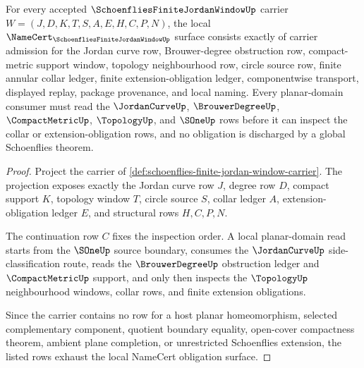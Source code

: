 \begin{theorem}
\label{thm:schoenflies-finite-jordan-window-namecert-obligations}
For every accepted $\SchoenfliesFiniteJordanWindowUp$ carrier $W=(J,D,K,T,S,A,E,H,C,P,N)$, the local $\NameCert_{\SchoenfliesFiniteJordanWindowUp}$ surface consists exactly of carrier admission for the Jordan curve row, Brouwer-degree obstruction row, compact-metric support window, topology neighbourhood row, circle source row, finite annular collar ledger, finite extension-obligation ledger, componentwise transport, displayed replay, package provenance, and local naming. Every planar-domain consumer must read the $\JordanCurveUp$, $\BrouwerDegreeUp$, $\CompactMetricUp$, $\TopologyUp$, and $\SOneUp$ rows before it can inspect the collar or extension-obligation rows, and no obligation is discharged by a global Schoenflies theorem.
\end{theorem}
\begin{proof}
Project the carrier of \autoref{def:schoenflies-finite-jordan-window-carrier}. The projection exposes exactly the Jordan curve row $J$, degree row $D$, compact support $K$, topology window $T$, circle source $S$, collar ledger $A$, extension-obligation ledger $E$, and structural rows $H,C,P,N$.

The continuation row $C$ fixes the inspection order. A local planar-domain read starts from the $\SOneUp$ source boundary, consumes the $\JordanCurveUp$ side-classification route, reads the $\BrouwerDegreeUp$ obstruction ledger and $\CompactMetricUp$ support, and only then inspects the $\TopologyUp$ neighbourhood windows, collar rows, and finite extension obligations.

Since the carrier contains no row for a host planar homeomorphism, selected complementary component, quotient boundary equality, open-cover compactness theorem, ambient plane completion, or unrestricted Schoenflies extension, the listed rows exhaust the local NameCert obligation surface.
\end{proof}


